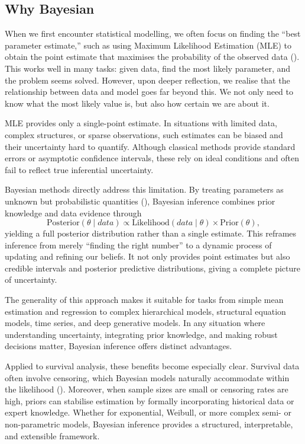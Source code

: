 \subsection{Why Bayesian}\label{Why Bayesian}
When we first encounter statistical modelling, we often focus on finding the “best parameter estimate,” such as using Maximum Likelihood Estimation (MLE) to obtain the point estimate that maximises the probability of the observed data (\cite{van2021bayesian}). This works well in many tasks: given data, find the most likely parameter, and the problem seems solved. However, upon deeper reflection, we realise that the relationship between data and model goes far beyond this. We not only need to know what the most likely value is, but also how certain we are about it.

MLE provides only a single-point estimate. In situations with limited data, complex structures, or sparse observations, such estimates can be biased and their uncertainty hard to quantify. Although classical methods provide standard errors or asymptotic confidence intervals, these rely on ideal conditions and often fail to reflect true inferential uncertainty.

Bayesian methods directly address this limitation. By treating parameters as unknown but probabilistic quantities (\cite{van2021bayesian}), Bayesian inference combines prior knowledge and data evidence through
$$
\text{Posterior}(\theta \mid data)
\propto
\text{Likelihood}(data \mid \theta)
\times
\text{Prior}(\theta),
$$
yielding a full posterior distribution rather than a single estimate. This reframes inference from merely “finding the right number” to a dynamic process of updating and refining our beliefs. It not only provides point estimates but also credible intervals and posterior predictive distributions, giving a complete picture of uncertainty.

The generality of this approach makes it suitable for tasks from simple mean estimation and regression to complex hierarchical models, structural equation models, time series, and deep generative models. In any situation where understanding uncertainty, integrating prior knowledge, and making robust decisions matter, Bayesian inference offers distinct advantages.

Applied to survival analysis, these benefits become especially clear. Survival data often involve censoring, which Bayesian models naturally accommodate within the likelihood (\cite{bartovs2022informed}). Moreover, when sample sizes are small or censoring rates are high, priors can stabilise estimation by formally incorporating historical data or expert knowledge. Whether for exponential, Weibull, or more complex semi- or non-parametric models, Bayesian inference provides a structured, interpretable, and extensible framework.

